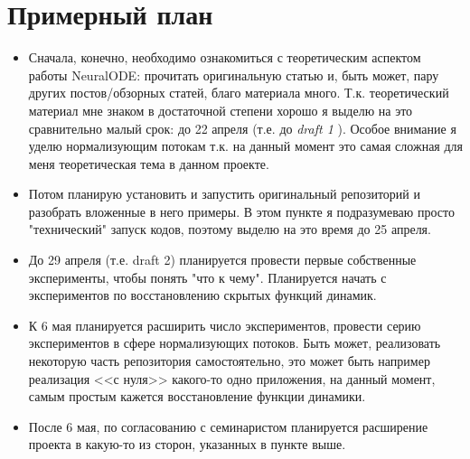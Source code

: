 \documentclass[]{scrartcl}
\newcommand{\tit}[1]{%
\textit{#1}%
}
\begin{document}
\section{Примерный план}
\begin{itemize}
	\item Сначала, конечно, необходимо ознакомиться с теоретическим аспектом работы NeuralODE: прочитать оригинальную статью и, быть может, пару других постов/обзорных статей, благо материала много. Т.к. теоретический материал мне знаком в достаточной степени хорошо я выделю на это сравнительно малый срок: до 22 апреля (т.е. до \tit{draft 1} ). Особое внимание я уделю нормализующим потокам т.к. на данный момент это самая сложная для меня теоретическая тема в данном проекте.
	\item Потом планирую установить и запустить оригинальный репозиторий и разобрать вложенные в него примеры. В этом пункте я подразумеваю просто "технический" запуск кодов, поэтому выделю на это время до 25 апреля.
	\item До 29 апреля (т.е. draft 2) планируется провести первые собственные эксперименты, чтобы понять "что к чему". Планируется начать с экспериментов по восстановлению скрытых функций динамик.
	\item К 6 мая планируется расширить число экспериментов, провести серию экспериментов в сфере нормализующих потоков. Быть может, реализовать некоторую часть репозитория самостоятельно, это может быть например реализация <<с нуля>> какого-то одно приложения, на данный момент, самым простым кажется восстановление функции динамики.
	\item После 6 мая, по согласованию с семинаристом планируется расширение проекта в какую-то из сторон, указанных в пункте выше.  
\end{itemize}



\end{document}
